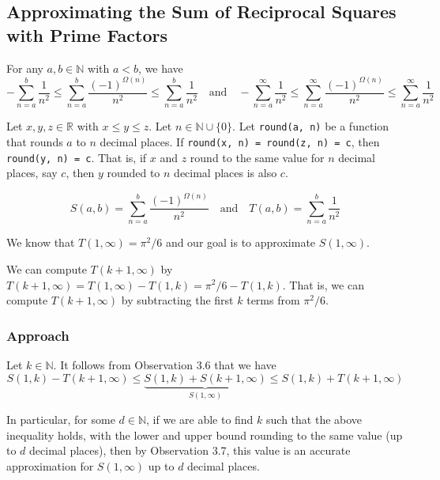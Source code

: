 \subsection{Approximating the Sum of Reciprocal Squares with Prime Factors}

\begin{observation}
	For any $a, b \in \mathbb{N}$ with $a < b$, we have
	$$-\sum_{n=a}^b \frac{1}{n^2} \leq \sum_{n=a}^b \frac{(-1)^{\Omega(n)}}{n^2} \leq \sum_{n=a}^b \frac{1}{n^2} \quad \text{and} \quad -\sum_{n=a}^\infty \frac{1}{n^2} \leq \sum_{n=a}^\infty \frac{(-1)^{\Omega(n)}}{n^2} \leq \sum_{n=a}^\infty \frac{1}{n^2}$$
\end{observation}

\begin{observation}
	Let $x, y, z \in \mathbb{R}$ with $x \leq y \leq z$. Let $n \in \mathbb{N} \cup \{0\}$. Let \lstinline|round(a, n)| be a function that rounds $a$ to $n$ decimal places. If \lstinline|round(x, n) = round(z, n) = c|, then \lstinline|round(y, n) = c|. That is, if $x$ and $z$ round to the same value for $n$ decimal places, say $c$, then $y$ rounded to $n$ decimal places is also $c$.
\end{observation}

\begin{notation}
$$S(a, b) = \sum_{n = a}^b \frac{(-1)^{\Omega(n)}}{n^2} \quad \text{and} \quad T(a, b) = \sum_{n = a}^b \frac{1}{n^2}$$
\end{notation}
\noindent
We know that $T(1, \infty) = \pi^2 / 6$ and our goal is to approximate $S(1, \infty)$.

\newpage
\begin{observation}
	We can compute $T(k + 1, \infty)$ by $T(k + 1, \infty) = T(1, \infty) - T(1, k) = \pi^2 / 6 - T(1, k)$. That is, we can compute $T(k + 1, \infty)$ by subtracting the first $k$ terms from $\pi^2 / 6$.
\end{observation}

\subsubsection{Approach}

Let $k \in \mathbb{N}$. It follows from Observation 3.6 that we have
$$S(1, k) - T(k + 1, \infty) \leq \underbrace{S(1, k) + S(k + 1, \infty)}_{S(1, \infty)} \leq S(1, k) + T(k + 1, \infty)$$

\noindent
In particular, for some $d \in \mathbb{N}$, if we are able to find $k$ such that the above inequality holds, with the lower and upper bound rounding to the same value (up to $d$ decimal places), then by Observation 3.7, this value is an accurate approximation for $S(1, \infty)$ up to $d$ decimal places.

